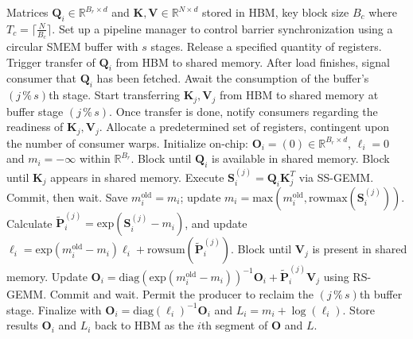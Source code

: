 \begin{algorithm}[H]
    \caption{\small\label{alg:flash3_wgmma_ws_only}\textsc{FlashAttention-3} forward pass \textbf{excluding} intra-consumer overlap -- CTA perspective}
    \begin{algorithmic}[1]
\REQUIRE Matrices $\mathbf{Q}_i \in \mathbb{R}^{B_r \times d}$ and $\mathbf{K}, \mathbf{V} \in \mathbb{R}^{N \times d}$ stored in HBM, key block size $B_c$ where $T_c = \lceil \frac{N}{B_c} \rceil$.
\STATE Set up a pipeline manager to control barrier synchronization using a circular SMEM buffer with $s$ stages.
\STATE Release a specified quantity of registers.
\STATE Trigger transfer of $\mathbf{Q}_i$ from HBM to shared memory.
\STATE After load finishes, signal consumer that $\mathbf{Q}_i$ has been fetched.
    \STATE Await the consumption of the buffer's $(j\,\%\,s)$th stage.
    \STATE Start transferring $\mathbf{K}_j, \mathbf{V}_j$ from HBM to shared memory at buffer stage $(j\,\%\,s)$.
    \STATE Once transfer is done, notify consumers regarding the readiness of $\mathbf{K}_j, \mathbf{V}_j$.
\ENDFOR
\ELSE \STATE Allocate a predetermined set of registers, contingent upon the number of consumer warps.
\STATE Initialize on-chip: $\mathbf{O}_i = (0) \in \mathbb{R}^{B_r \times d}$, $\ell_i = 0$ and $m_i = -\infty$ within $\mathbb{R}^{B_r}$.
\STATE Block until $\mathbf{Q}_i$ is available in shared memory.
\STATE Block until $\mathbf{K}_j$ appears in shared memory.
\STATE Execute $\mathbf{S}_i^{(j)} = \mathbf{Q}_i \mathbf{K}_j^T$ via SS-GEMM. Commit, then wait. \label{alg:ws_only_gemm1}
\STATE Save $m_i^{\mathrm{old}} = m_i$; update $m_i = \mathrm{max}(m_i^{\mathrm{old}}, \mathrm{rowmax}(\mathbf{S}_i^{(j)}))$. \label{code-ws:softmax_start}
\STATE Calculate $\widetilde{\mathbf{P}}_i^{(j)} = \mathrm{exp}(\mathbf{S}_i^{(j)} - m_i)$, and update $\ell_i = \mathrm{exp}(m_i^{\mathrm{old}} - m_i)\ell_i + \mathrm{rowsum}(\widetilde{\mathbf{P}}_i^{(j)})$. \label{code-ws:softmax_end}
\STATE Block until $\mathbf{V}_j$ is present in shared memory.
\STATE Update $\mathbf{O}_i = \mathrm{diag}(\mathrm{exp}(m_i^{\mathrm{old}} - m_i))^{-1} \mathbf{O}_i + \widetilde{\mathbf{P}}_i^{(j)} \mathbf{V}_j$ using RS-GEMM. Commit and wait. \label{alg:ws_only_gemm2}
\STATE Permit the producer to reclaim the $(j\,\%\,s)$th buffer stage.
\ENDFOR
\STATE Finalize with $\mathbf{O}_i = \mathrm{diag}(\ell_i)^{-1} \mathbf{O}_i$ and $L_i = m_i + \log(\ell_i)$.
\STATE Store results $\mathbf{O}_i$ and $L_i$ back to HBM as the $i$th segment of $\mathbf{O}$ and $L$.
\ENDIF
\end{algorithmic}
\end{algorithm}

